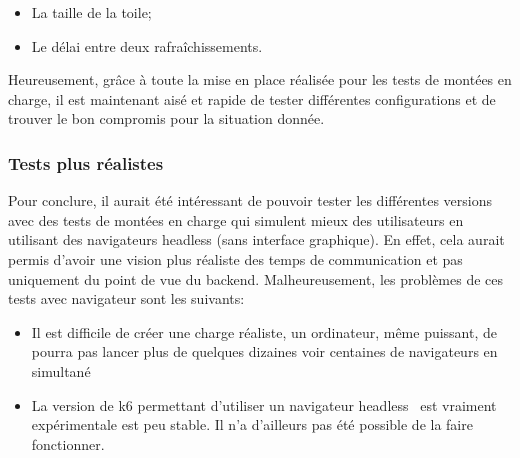 \begin{itemize}
  \item La taille de la toile;
  \item Le délai entre deux rafraîchissements.
\end{itemize}

Heureusement, grâce à toute la mise en place réalisée pour les tests de montées en charge, il est maintenant aisé et rapide de tester différentes configurations et de trouver le bon compromis pour la situation donnée.

\subsubsection{Tests plus réalistes}

Pour conclure, il aurait été intéressant de pouvoir tester les différentes versions avec des tests de montées en charge qui simulent mieux des utilisateurs en utilisant des navigateurs headless (sans interface graphique). En effet, cela aurait permis d'avoir une vision plus réaliste des temps de communication et pas uniquement du point de vue du backend. Malheureusement, les problèmes de ces tests avec navigateur sont les suivants:

\begin{itemize}
  \item Il est difficile de créer une charge réaliste, un ordinateur, même puissant, de pourra pas lancer plus de quelques dizaines voir centaines de navigateurs en simultané
  \item La version de k6 permettant d'utiliser un navigateur headless~\cite{k6-browser} est vraiment expérimentale est peu stable. Il n'a d'ailleurs pas été possible de la faire fonctionner.
\end{itemize}

